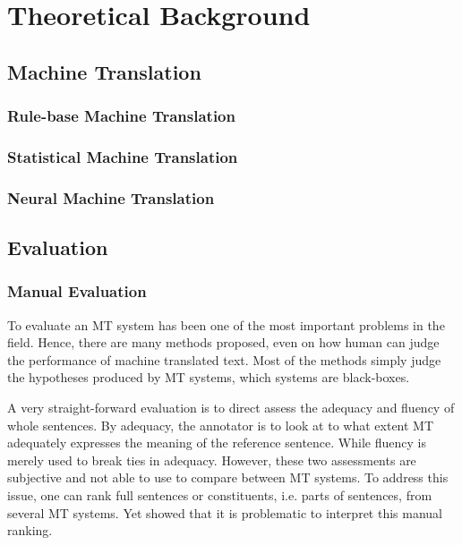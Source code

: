 \chapter{Theoretical Background}

\section{Machine Translation}

\subsection{Rule-base Machine Translation}

\subsection{Statistical Machine Translation}

\subsection{Neural Machine Translation}

\section{Evaluation}

\subsection{Manual Evaluation}
To evaluate an MT system has been one of the most important problems in the field. Hence, there are many methods proposed, even on how human can judge the performance of machine translated text. Most of the methods simply judge the hypotheses produced by MT systems, which systems are black-boxes.

A very straight-forward evaluation is to direct assess the adequacy and fluency of whole sentences. By adequacy, the annotator is to look at to what extent MT adequately expresses the meaning of the reference sentence. While fluency is merely used to break ties in adequacy. However, these two assessments are subjective and not able to use to compare between MT systems. To address this issue, one can rank full sentences or constituents, i.e. parts of sentences, from several MT systems. Yet \cite{DBLP:conf/wmt/BojarEPZ11} showed that it is problematic to interpret this manual ranking.



